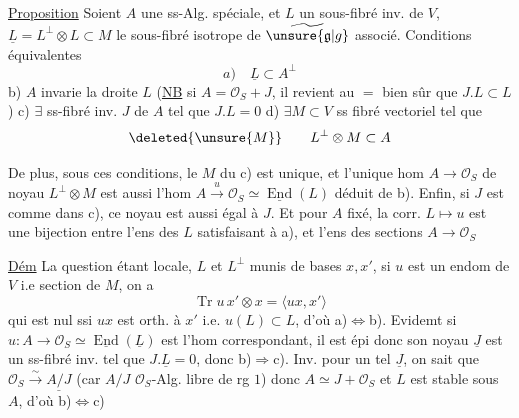 \uline{Proposition} Soient $A$ une ss-Alg. spéciale, et $L$ un sous-fibré inv. de $V$, $\underline L=L^\perp\otimes L\subset M$ le sous-fibré isotrope de $\widetilde{\unsure{\mathfrak g|g}}$ associé. Conditions équivalentes
\[
 a)\quad \underline L\subset A^\perp
\]
b) $A$ invarie la droite $L$ (\uline{NB} si $A=\mathcal O_S+J$, il revient au $=$ bien sûr que $J.L\subset L$)
c) $\exists$ ss-fibré inv. $J$ de $A$ tel que $J.L=0$
d) $\exists M\subset V$ ss fibré vectoriel  tel que
\[
 \deleted{\unsure{M}}\qquad L^\perp\otimes M\subset A
\]

De plus, sous ces conditions, le $M$ du c) est unique, et l'unique hom $A\longrightarrow\mathcal O_S$ de noyau $L^\perp\otimes M$  est aussi l'hom $A\xrightarrow{u}\mathcal O_S\simeq\underline{\operatorname{End}}(L)$ déduit de b).
Enfin, si $J$ est comme dans c), ce noyau est aussi égal à $J$. Et pour $A$ fixé, la corr. $L\mapsto u$ est une bijection entre l'ens des $L$ satisfaisant à a), et l'ens des sections  $A\to\mathcal O_S$

\uline{Dém} La question étant locale,  $L$  et $L^\perp$ munis de bases $x,x'$,  si $u$ est  un endom de $V$ i.e section de $M$, on a
\[
 \operatorname{Tr}u\,x'\otimes x=\langle ux,x'\rangle
\]
qui est nul ssi $ux$ est orth. à $x'$ i.e. $u(L)\subset L$, d'où a)$\Longleftrightarrow$b). Evidemt si $u:A\to\mathcal O_S\simeq\underline{\operatorname{End}}(\underline L)$ est l'hom correspondant, il est épi donc son noyau $\underline J$ est un ss-fibré inv. tel que $J.\underline L=0$, donc b)$\Rightarrow$c).
Inv. pour un tel $\underline J$, on sait  que $\mathcal O_S\xrightarrow{\sim}\underline{A/J}$ (car $A/J$ $\mathcal O_S$-Alg. libre de rg $1$) donc $A\simeq J+\mathcal O_S$ et $L$ est stable sous $A$, d'où b)$\Longleftrightarrow$c)
